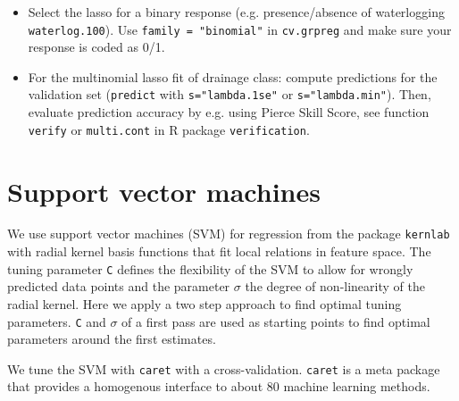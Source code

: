 \documentclass[11pt,a4paper,twoside]{article}\usepackage[]{graphicx}\usepackage[]{color}
\begin{document}
\begin{itemize}
\item Select the lasso for a binary response (e.g. presence/absence of waterlogging \texttt{waterlog.100}). Use \texttt{family = "binomial"} in \texttt{cv.grpreg} and make sure your response is coded as 0/1. 
\item For the multinomial lasso fit of drainage class: compute predictions for the validation set (\texttt{predict} with \texttt{s="lambda.1se"} or \texttt{s="lambda.min"}). Then, evaluate prediction accuracy by e.g. using Pierce Skill Score, see function \texttt{verify} or \texttt{multi.cont} in R package \texttt{verification}. 
\end{itemize}


\clearpage
\section{Support vector machines}


We use support vector machines (SVM) for regression from the package \texttt{kernlab} with radial kernel basis functions that fit local relations in feature space. The tuning parameter \texttt{C} defines the flexibility of the SVM to allow for wrongly predicted data points and the parameter $\sigma$ the degree of non-linearity of the radial kernel. Here we apply a two step approach to find optimal tuning parameters. \texttt{C} and $\sigma$ of a first pass are used as starting points to find optimal parameters around the first estimates.

We tune the SVM with \texttt{caret} with a cross-validation. \texttt{caret} is a meta package that provides a homogenous interface to about 80 machine learning methods. 
\end{document}
